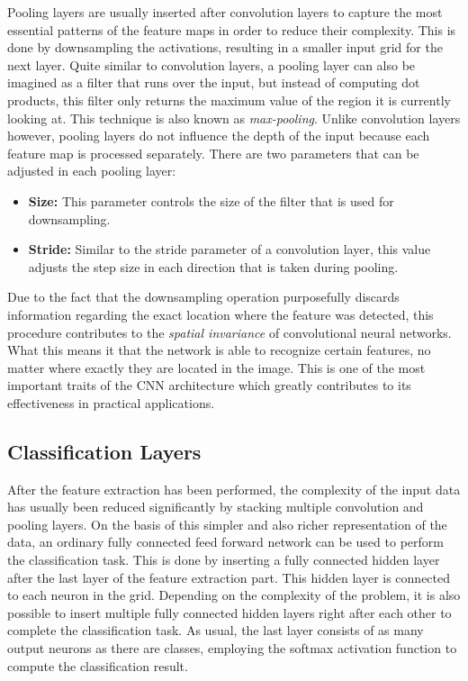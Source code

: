 Pooling layers are usually inserted after convolution layers to capture
the most essential patterns of the feature maps in order to reduce
their complexity. This is done by downsampling the activations,
resulting in a smaller input grid for the next layer. Quite similar to
convolution layers, a pooling layer can also be imagined as a filter
that runs over the input, but instead of computing dot products, this
filter only returns the maximum value of the region it is currently
looking at. This technique is also known as
\textit{max-pooling}. Unlike convolution layers however, pooling
layers do not influence the depth of the input because each feature
map is processed separately. There are two parameters that can be
adjusted in each pooling layer:
\begin{itemize}
  \item \textbf{Size:} This parameter controls the size of the filter
    that is used for downsampling.
  \item \textbf{Stride:} Similar to the stride parameter of a
    convolution layer, this value adjusts the step size in each
    direction that is taken during pooling.
\end{itemize}
Due to the fact that the downsampling operation purposefully discards
information regarding the exact location where the feature was
detected, this procedure contributes to the \textit{spatial
  invariance} of convolutional neural networks. What this means it that
the network is able to recognize certain features, no matter where
exactly they are located in the image. This is one of the most
important traits of the CNN architecture which greatly contributes to
its effectiveness in practical applications.

\subsection{Classification Layers}

After the feature extraction has been performed, the complexity of the
input data has usually been reduced significantly by stacking multiple
convolution and pooling layers. On the basis of this simpler and also
richer representation of the data, an ordinary fully connected feed
forward network can be used to perform the classification task. This
is done by inserting a fully connected hidden layer after the last
layer of the feature extraction part. This hidden layer is connected
to each neuron in the grid. Depending on the complexity of the
problem, it is also possible to insert multiple fully connected hidden
layers right after each other to complete the classification task. As
usual, the last layer consists of as many output neurons as there are
classes, employing the softmax activation function to compute the
classification result.

